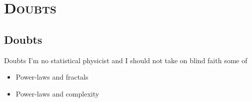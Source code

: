 \documentclass[xcolor=x11names,compress]{beamer}
\renewcommand{\(}{\begin{columns}}
\renewcommand{\)}{\end{columns}}
\newcommand{\<}[1]{\begin{column}{#1}}
\renewcommand{\>}{\end{column}}
\begin{document}



\section{\scshape Doubts}
\subsection{Doubts}
\begin{frame}{Doubts}
I'm no statistical physicist and I should not take on blind faith some of 
    \begin{itemize}
        \item Power-laws and fractals
        \item Power-laws and complexity
    \end{itemize}
\end{frame}
\end{document}
